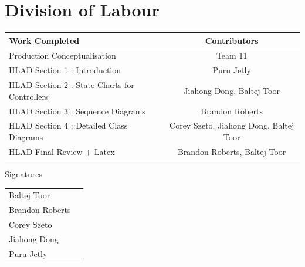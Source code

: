 \documentclass[]{article}
\begin{document}
\section{Division of Labour}
\label{sec:division_of_labour}
\begin{center}
\large
			\begin{tabular}{l|c}
				Work Completed   & Contributors \\\hline
				Production Conceptualisation &Team 11 \\
				HLAD Section 1 : Introduction & Puru Jetly \\
				HLAD Section 2 : State Charts for Controllers  & Jiahong Dong, Baltej Toor \\
				HLAD Section 3 : Sequence Diagrams  & Brandon Roberts  \\
				HLAD Section 4 : Detailed Class Diagrams & Corey Szeto, Jiahong Dong, Baltej Toor \\
				HLAD Final Review + Latex  & Brandon Roberts, Baltej Toor \\
			\end{tabular}
			\vspace{0.1in}
\huge Signatures
\end{center}
			\vspace{0.3in}
\large
			\begin{tabular}{l|r}
			\vspace{1in}
				Baltej Toor  & \underline{\hspace{8cm}} \\
			\vspace{1in}
				Brandon Roberts   & \underline{\hspace{8cm}} \\
			\vspace{1in}
				Corey Szeto  & \underline{\hspace{8cm}} \\
			\vspace{1in}
				Jiahong Dong   & \underline{\hspace{8cm}} \\
			\vspace{1in}
				Puru Jetly   & \underline{\hspace{8cm}} \\
			\end{tabular}
\end{document}
